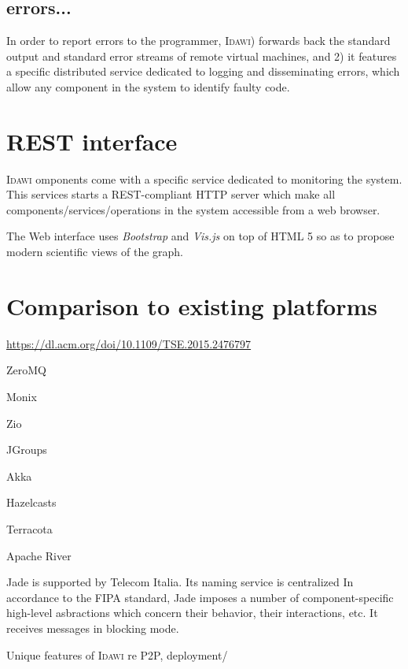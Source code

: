 \documentclass{article}
\newcommand{\idawi}[1]{\textsc{Idawi}\xspace}
\begin{document}
\subsection{errors...}
In order to report errors to the programmer, \idawi 1) forwards back the standard output and standard error streams of remote virtual machines, and 2) it features a specific distributed service dedicated to logging and disseminating errors, which allow any component in the system to identify faulty code.

\section{REST interface}
\idawi components come with a specific service dedicated to monitoring the system. This services starts a REST-compliant HTTP server which make all components/services/operations in the system accessible from a web browser.

The Web interface uses \textit{Bootstrap} and \textit{Vis.js} on top of HTML 5 so as to propose modern scientific views of the graph.

\section{Comparison to existing platforms}

\url{https://dl.acm.org/doi/10.1109/TSE.2015.2476797}

ZeroMQ

Monix

Zio 

JGroups

Akka

Hazelcasts

Terracota

Apache River

Jade is supported by Telecom Italia.
Its naming service is centralized
In accordance to the FIPA standard, Jade imposes a number of component-specific high-level asbractions which concern their behavior, their interactions, etc.
It receives messages in blocking mode.

Unique features of \idawi are P2P, deployment/
\end{document}
